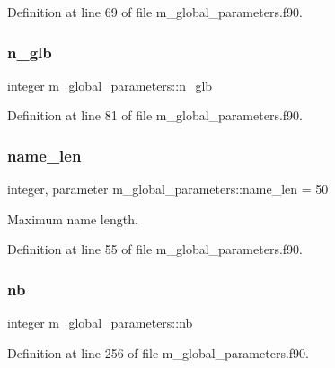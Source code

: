 Definition at line 69 of file m\+\_\+global\+\_\+parameters.\+f90.

\mbox{\label{namespacem__global__parameters_adab11dab474410541d4c37725bea01e1}} 
\subsubsection{\texorpdfstring{n\+\_\+glb}{n\_glb}}
{\footnotesize\ttfamily integer m\+\_\+global\+\_\+parameters\+::n\+\_\+glb}



Definition at line 81 of file m\+\_\+global\+\_\+parameters.\+f90.

\mbox{\label{namespacem__global__parameters_ac8252b115e717c6f1c8595be6f897df7}} 
\subsubsection{\texorpdfstring{name\+\_\+len}{name\_len}}
{\footnotesize\ttfamily integer, parameter m\+\_\+global\+\_\+parameters\+::name\+\_\+len = 50}



Maximum name length. 



Definition at line 55 of file m\+\_\+global\+\_\+parameters.\+f90.

\mbox{\label{namespacem__global__parameters_ad76c4758994b52559f478d251dc0cba5}} 
\subsubsection{\texorpdfstring{nb}{nb}}
{\footnotesize\ttfamily integer m\+\_\+global\+\_\+parameters\+::nb}



Definition at line 256 of file m\+\_\+global\+\_\+parameters.\+f90.


